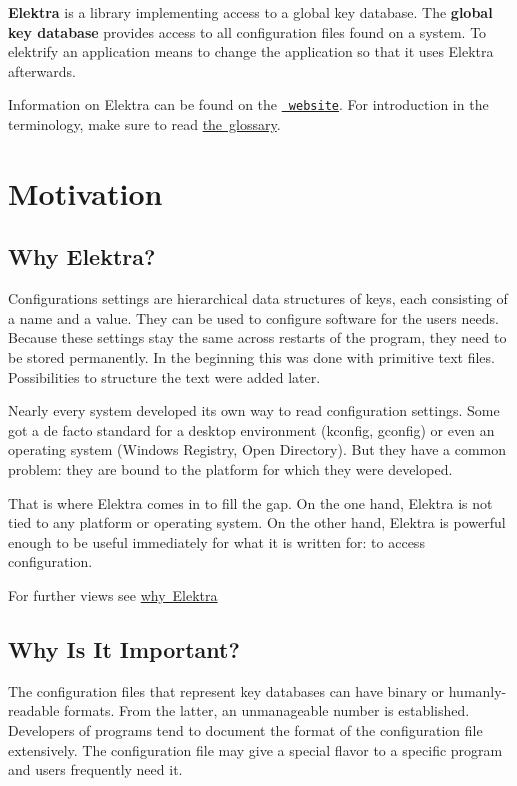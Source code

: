 {\bfseries{Elektra}} is a library implementing access to a global key database. The {\bfseries{global key database}} provides access to all configuration files found on a system. To elektrify an application means to change the application so that it uses Elektra afterwards.

Information on Elektra can be found on the \href{https://www.libelektra.org}{\texttt{ website}}. For introduction in the terminology, make sure to read \mbox{\hyperlink{doc_help_elektra-glossary_md}{the glossary}}.\hypertarget{doc_help_elektra-introduction_md_autotoc_md1570}{}\section{Motivation}\label{doc_help_elektra-introduction_md_autotoc_md1570}
\hypertarget{doc_help_elektra-introduction_md_autotoc_md1571}{}\subsection{Why Elektra?}\label{doc_help_elektra-introduction_md_autotoc_md1571}
Configurations settings are hierarchical data structures of keys, each consisting of a name and a value. They can be used to configure software for the user\textquotesingle{}s needs. Because these settings stay the same across restarts of the program, they need to be stored permanently. In the beginning this was done with primitive text files. Possibilities to structure the text were added later.

Nearly every system developed its own way to read configuration settings. Some got a de facto standard for a desktop environment (kconfig, gconfig) or even an operating system (Windows Registry, Open Directory). But they have a common problem\+: they are bound to the platform for which they were developed.

That is where Elektra comes in to fill the gap. On the one hand, Elektra is not tied to any platform or operating system. On the other hand, Elektra is powerful enough to be useful immediately for what it is written for\+: to access configuration.

For further views see \mbox{\hyperlink{doc_WHY_md}{why Elektra}}\hypertarget{doc_help_elektra-introduction_md_autotoc_md1572}{}\subsection{Why Is It Important?}\label{doc_help_elektra-introduction_md_autotoc_md1572}
The configuration files that represent key databases can have binary or humanly-\/readable formats. From the latter, an unmanageable number is established. Developers of programs tend to document the format of the configuration file extensively. The configuration file may give a special flavor to a specific program and users frequently need it.

